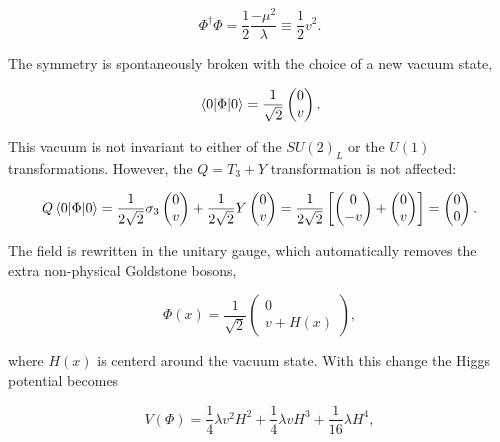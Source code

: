 \begin{equation}
    \Phi^\dag\Phi=\frac{1}{2}\frac{-\mu^2}{\lambda}\equiv\frac{1}{2}v^2.
\end{equation}

The symmetry is spontaneously broken with the choice of a new vacuum state,

\begin{equation}
    \expval{\Phi}{0} =\frac{1}{\sqrt{2}}\begin{pmatrix}
    0\\v
    \end{pmatrix}.
\end{equation}

This vacuum is not invariant to either of the $SU(2)_L$ or the $U(1)$ transformations. However, the $Q=T_3+Y$ transformation is not affected:

\begin{equation}
    Q\expval{\Phi}{0} = \frac{1}{2\sqrt{2}}\sigma_3\begin{pmatrix}0\\v\end{pmatrix}+\frac{1}{2\sqrt{2}}Y\begin{pmatrix}0\\v\end{pmatrix} = \frac{1}{2\sqrt{2}}\left[ 
    \begin{pmatrix} 0 \\ -v  \end{pmatrix} +
    \begin{pmatrix} 0 \\ v  \end{pmatrix}\right] = \begin{pmatrix}
    0\\0
    \end{pmatrix}.
\end{equation}

The field is rewritten in the unitary gauge, which automatically removes the extra non-physical Goldstone bosons,

\begin{equation}
    \Phi(x) = \frac{1}{\sqrt{2}}\begin{pmatrix}
    0 \\ v+H(x)
    \end{pmatrix},
\end{equation}

where $H(x)$ is centerd around the vacuum state. With this change the Higgs potential becomes

\begin{equation}
    V(\Phi) =\frac{1}{4}\lambda v^2 H^2 + \frac{1}{4} \lambda v H^3 + \frac{1}{16} \lambda H^4,
\end{equation}

